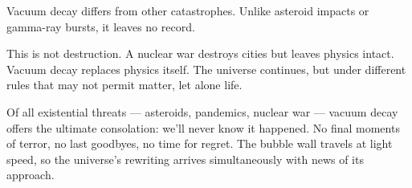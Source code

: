 Vacuum decay differs from other catastrophes. Unlike asteroid impacts or gamma-ray bursts, it leaves no record.

This is not destruction. A nuclear war destroys cities but leaves physics intact. Vacuum decay replaces physics itself. The universe continues, but under different rules that may not permit matter, let alone life.

\newpage

\begin{commentary}
Of all existential threats — asteroids, pandemics, nuclear war — vacuum decay offers the ultimate consolation: we'll never know it happened. No final moments of terror, no last goodbyes, no time for regret. The bubble wall travels at light speed, so the universe's rewriting arrives simultaneously with news of its approach.


\end{commentary}
